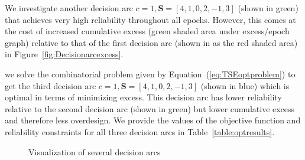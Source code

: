 We investigate another decision arc $c=1,\mathbf{S}=\left[4,1,0,2,-1,3\right]$ (shown in green) that achieves very high reliability throughout all epochs. However, this comes at the cost of increased cumulative excess (green shaded area under excess/epoch graph) relative to that of the first decision arc (shown in as the red shaded area) in Figure~\ref{fig:Decisionarcexcess}.

we solve the combinatorial problem given by Equation~(\ref{eq:TSEoptproblem}) to get the third decision arc $c=1,\mathbf{S}=\left[4,1,0,2,-1,3\right]$ (shown in blue) which is optimal in terms of minimizing excess. This decision arc has lower reliability relative to the second decision arc (shown in green) but lower cumulative excess and therefore less overdesign. We provide the values of the objective function and reliability constraints for all three decision arcs in Table~\ref{table:optresults}.

\begin{figure}[h!]
	\centering
	 \hspace{0.1\textwidth}%
	 \hspace{0.1\textwidth}%
	\caption{Visualization of several decision arcs}
	\label{fig:epocheraexample}
\end{figure}

\newcommand{\ocwa}{0.75cm} %
\newcommand{\ocwb}{3cm} %
\newcommand{\ocwc}{1.5cm} %
\newcommand{\ocwd}{2cm} %
\newcommand{\ocwe}{3cm} %

